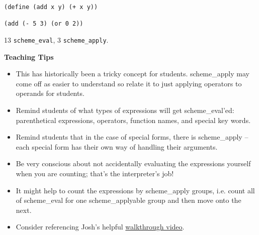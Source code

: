 \begin{blocksection}
\vspace{2\baselineskip}
\begin{lstlisting}
(define (add x y) (+ x y))

(add (- 5 3) (or 0 2))
\end{lstlisting}

\begin{solution}[1in]
13 \lstinline$scheme_eval$, 3 \lstinline$scheme_apply$.
\end{solution}

\end{blocksection}

\begin{blocksection}
\begin{guide}
\textbf{Teaching Tips}
\begin{itemize}
	\item This has historically been a tricky concept for students. scheme\_apply may come off as easier to understand so relate it to just applying operators to operands for students.
	\item Remind students of what types of expressions will get scheme\_eval'ed: parenthetical expressions, operators, function names, and special key words.
	\item Remind students that in the case of special forms, there is scheme\_apply -- each special form has their own way of handling their arguments.
	\item Be very conscious about not accidentally evaluating the expressions yourself when you are counting; that's the interpreter's job!
	\item It might help to count the expressions by scheme\_apply groups, i.e. count all of scheme\_eval for one scheme\_applyable group and then move onto the next.
	\item Consider referencing Josh's helpful \href{https://drive.google.com/file/d/1YH6eaOAzPx8MC0fO60bIbq9oZipC2lEd/view}{walkthrough video}.
\end{itemize}
\end{guide}
\end{blocksection}
